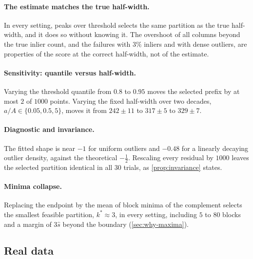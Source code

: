 \paragraph{The estimate matches the true half-width.}
In every setting, peaks over threshold selects the same partition as the
true half-width, and it does so without knowing it.  The overshoot of all
columns beyond the true inlier count, and the failures with $3\%$ inliers
and with dense outliers, are properties of the \gaussunif score at the
correct half-width, not of the estimate.

\paragraph{Sensitivity: quantile versus half-width.}
Varying the threshold quantile from $0.8$ to $0.95$ moves the selected
prefix by at most $2$ of $1000$ points.  Varying the fixed half-width over
two decades, $a/A \in \{0.05, 0.5, 5\}$, moves it from $242 \pm 11$ to
$317 \pm 5$ to $329 \pm 7$.  

\paragraph{Diagnostic and invariance.}
The fitted shape is near $-1$ for uniform outliers and $-0.48$ for a
linearly decaying outlier density, against the theoretical $-\tfrac12$.
Rescaling every residual by $1000$ leaves the selected partition identical
in all $30$ trials, as \cref{prop:invariance} states.

\paragraph{Minima collapse.}
Replacing the endpoint by the mean of block minima of the complement
selects the smallest feasible partition, $k^* \approx 3$, in every setting,
including $5$ to $80$ blocks and a margin of $3\hat s$ beyond the boundary
(\cref{sec:why-maxima}).

\subsection{Real data}
\label{sec:real}

